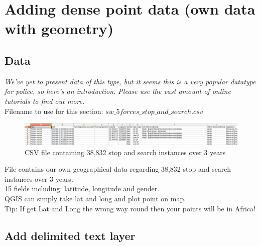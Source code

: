 \chapter{Adding dense point data (own data with geometry)}

\pagestyle{fancy}
\fancyhf{}
\fancyhead[OC]{\leftmark}
\fancyhead[EC]{\rightmark}
\cfoot{\thepage}


\section{Data}

\textit{We've yet to present data of this type, but it seems this is a very popular datatype for police, so here's an introduction. Please use the vast amount of online tutorials to find out more.}\\

Filename to use for this section: $sw\_5forces\_stop\_and\_search.csv$

\begin{figure}[!h]
	\centering
	\includegraphics[width=1\textwidth]{images/image1.png}
	\caption{CSV file containing 38,832 stop and search instances over 3 years}
	\label{ft_fig_firstfig3}
\end{figure}

File contains our own geographical data regarding 38,832 stop and search instances over 3 years.\\
15 fields including: latitude, longitude and gender.\\
QGIS can simply take lat and long and plot point on map.\\
Tip: If get Lat and Long the wrong way round then your points will be in Africa!

\section{Add delimited text layer}

